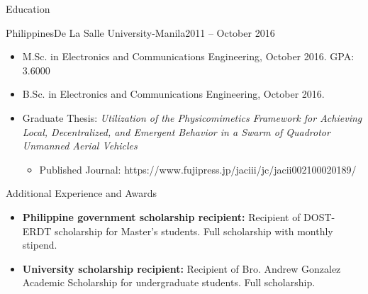\documentclass[]{mcdowellcv}
\begin{document}
	\begin{cvsection}{Education}
		\begin{cvsubsection}{Philippines}{De La Salle University-Manila}{2011 -- October 2016}
			\begin{itemize}
				\item M.Sc. in Electronics and Communications Engineering, October 2016. GPA: 3.6000
				\item B.Sc. in Electronics and Communications Engineering, October 2016.
				\item Graduate Thesis: \textit{Utilization of the Physicomimetics Framework for Achieving Local, Decentralized, and Emergent Behavior in a Swarm of Quadrotor Unmanned Aerial Vehicles}
				\begin{itemize}
				    \item Published Journal: https://www.fujipress.jp/jaciii/jc/jacii002100020189/
				\end{itemize}
			\end{itemize}
		\end{cvsubsection}
	\end{cvsection}
	
	\begin{cvsection}{Additional Experience and Awards}
		\begin{cvsubsection}{}{}{}	
			\begin{itemize}
				\item \textbf{Philippine government scholarship recipient:} Recipient of DOST-ERDT scholarship for Master's students. Full scholarship with monthly stipend.
				\item \textbf{University scholarship recipient:} Recipient of Bro. Andrew Gonzalez Academic Scholarship for undergraduate students. Full scholarship.    
			\end{itemize}
		\end{cvsubsection}
	\end{cvsection}
	
\end{document}
